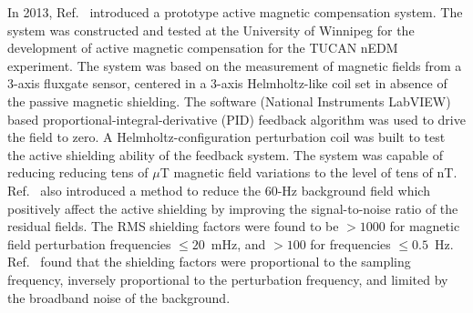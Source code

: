 In 2013, Ref.~\cite{mike} introduced a prototype active magnetic compensation system. The system was constructed and tested at the University of Winnipeg for the development of active magnetic compensation for the TUCAN nEDM experiment. The system was based on the measurement of magnetic fields from a 3-axis fluxgate sensor, centered in a 3-axis Helmholtz-like coil set in absence of the passive magnetic shielding. The software (National Instruments LabVIEW) based proportional-integral-derivative (PID) feedback algorithm was used to drive the field to zero. A Helmholtz-configuration perturbation coil was built to test the active shielding ability of the feedback system. The system was capable of reducing reducing tens of $\mu$T magnetic field variations to the level of tens of nT. Ref.~\cite{mike} also introduced a method to reduce the 60-Hz background field which positively affect the active shielding by improving the signal-to-noise ratio of the residual fields. The RMS shielding factors were found to be $>1000$ for magnetic field perturbation frequencies $\leq20$~mHz, and $>100$ for frequencies $\leq0.5$~Hz.  Ref.~\cite{mike} found that the shielding factors were proportional to the sampling frequency, inversely proportional to the perturbation frequency, and limited by the broadband noise of the background.





